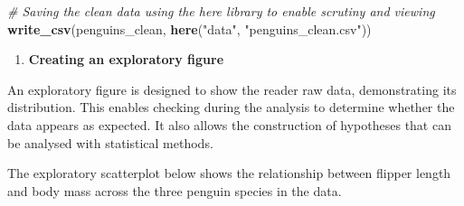 \documentclass[
]{article}
\newenvironment{Shaded}{\begin{snugshade}}{\end{snugshade}}
\newcommand{\CommentTok}[1]{\textcolor[rgb]{0.56,0.35,0.01}{\textit{#1}}}
\newcommand{\FunctionTok}[1]{\textcolor[rgb]{0.13,0.29,0.53}{\textbf{#1}}}
\newcommand{\NormalTok}[1]{#1}
\newcommand{\StringTok}[1]{\textcolor[rgb]{0.31,0.60,0.02}{#1}}
\providecommand{\tightlist}{%
  \setlength{\itemsep}{0pt}\setlength{\parskip}{0pt}}
\begin{document}
\begin{Shaded}
\begin{Highlighting}[]
\CommentTok{\# Saving the clean data using the here library to enable scrutiny and viewing}
\FunctionTok{write\_csv}\NormalTok{(penguins\_clean, }\FunctionTok{here}\NormalTok{(}\StringTok{"data"}\NormalTok{, }\StringTok{"penguins\_clean.csv"}\NormalTok{))}
\end{Highlighting}
\end{Shaded}

\begin{enumerate}
\def\labelenumi{\arabic{enumi}.}
\setcounter{enumi}{1}
\tightlist
\item
  \textbf{Creating an exploratory figure}
\end{enumerate}

An exploratory figure is designed to show the reader raw data,
demonstrating its distribution. This enables checking during the
analysis to determine whether the data appears as expected. It also
allows the construction of hypotheses that can be analysed with
statistical methods.

The exploratory scatterplot below shows the relationship between flipper
length and body mass across the three penguin species in the data.
\end{document}
